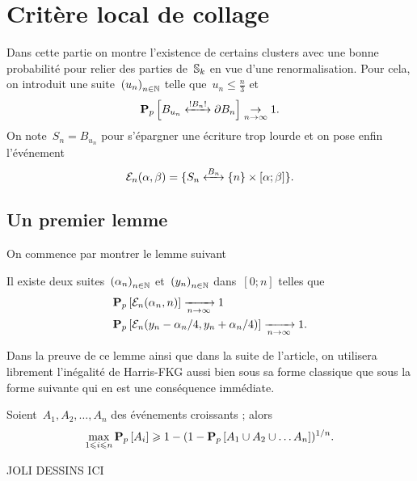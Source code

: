 \section{Critère local de collage}
Dans cette partie on montre l'existence de certains clusters avec une bonne probabilité pour relier des parties de~$\mathbb{S}_k$ en vue d'une renormalisation. Pour cela, on introduit une suite~$\suite{u}$ telle que~$u_n \leqslant \frac{n}{3}$ et
	\[
		\Pp{\relie*[B_n]{B_{u_n}}{\partial B_n}} \underset{n \to \infty}{\to} 1.
	\] 
	On note~$S_n = B_{u_n}$ pour s'épargner une écriture trop lourde et on pose enfin l'événement
	\[
		\mathcal{E}_n( \alpha, \beta ) = \{\relie[B_n]{S_n}{\{n\} \times [ \alpha ; \beta ]} \}.
	\]
	\subsection{Un premier lemme}
		On commence par montrer le lemme suivant
		\begin{lem}\label{lem:collagesElem} 
			Il existe deux suites~$\suite{\alpha}$ et~$\suite{y}$ dans~$[0; n]$ telles que
			\begin{align*}
				  &\bm{\mathrm{P}}_{p}\left[\mathcal{E}_n(\alpha_n, n)\right] \xrightarrow[n\to\infty]{} 1 \\ 
				  &\bm{\mathrm{P}}_{p}\left[\mathcal{E}_n(y_n - \alpha_n/4, y_n + \alpha_n/4)\right] \xrightarrow[n \to \infty]{} 1.
			\end{align*}
		\end{lem}
		Dans la preuve de ce lemme ainsi que dans la suite de l'article, on utilisera librement l'inégalité de Harris-FKG aussi bien sous sa forme classique que sous la forme suivante qui en est une conséquence immédiate. %
		\begin{lem}\label{lem:HarrisFKG}
			Soient~$A_1, A_2, \ldots, A_n$ des événements croissants ; alors
			\[
				\max_{1 \leqslant i \leqslant n} \bm{\mathrm{P}}_{p}\left[A_i\right] \geqslant 1 - (1 - \bm{\mathrm{P}}_{p}\left[A_1 \cup A_2 \cup \ldots A_n\right])^{1/n}. 
			\]
		\end{lem}
		
		JOLI DESSINS ICI %

